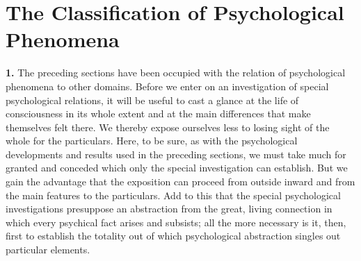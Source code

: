 \documentclass[12pt,a4paper]{book}
\newcommand{\opage}[1]{\marginnote{\footnotesize\textit{[#1]}}}
\begin{document}
\chapter[The Classification of Psychological Phenomena]{The Classification of Psychological Phenomena\opage{103}}
\label{ch:classification}

\noindent\textbf{1.} The preceding sections have been occupied with the
relation of psychological phenomena to other domains. Before we enter on
an investigation of special psychological relations, it will be useful to
cast a glance at the life of consciousness in its whole extent and at the
main differences that make themselves felt there. We thereby expose
ourselves less to losing sight of the whole for the particulars. Here, to
be sure, as with the psychological developments and results used in the
preceding sections, we must take much for granted and conceded which only
the special investigation can establish. But we gain the advantage that
the exposition can proceed from outside inward and from the main features
to the particulars. Add to this that the special psychological
investigations presuppose an abstraction from the great, living
connection in which every psychical fact arises and subsists; all the
more necessary is it, then, first to establish the totality out of which
psychological abstraction singles out particular elements.
\end{document}
